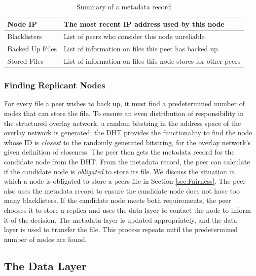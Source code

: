 \documentclass[12pt]{report}
\begin{document}
\begin{table}
\begin{center}
    \begin{tabular}{| l | l |}
    \hline
    Node IP & The most recent IP address used by this node\\ \hline
    Blacklisters & List of peers who consider this node unreliable\\ \hline
    Backed Up Files & List of information on files this peer has backed up \\ \hline
    Stored Files & List of information on files this node stores for other peers \\ \hline
    \end{tabular}
    \caption{Summary of a metadata record}
    \label{tab:metadataRecord}
\end{center}
\end{table}

\subsubsection{Finding Replicant Nodes} \label{subsubsec:FindingReplicantNodes}

For every file a peer wishes to back up, it must find a predetermined number of nodes that can store the file. To ensure an even distribution of responsibility in the structured overlay network, a random bitstring in the address space of the overlay network is generated; the DHT provides the functionality to find the node whose ID is \textit{closest} to the randomly generated bitstring, for the overlay network's given definition of closeness. The peer then gets the metadata record for the candidate node from the DHT. From the metadata record, the peer can calculate if the candidate node is \textit{obligated} to store its file. We discuss the situation in which a node is obligated to store a peers file in Section \ref{sec:Fairness}. The peer also uses the metadata record to ensure the candidate node does not have too many blacklisters. If the candidate node meets both requirements, the peer chooses it to store a replica and uses the data layer to contact the node to inform it of the decision. The metadata layer is updated appropriately, and the data layer is used to transfer the file. This process repeats until the predetermined number of nodes are found.

\subsection{The Data Layer} \label{subsec:TheDataLayer}
\end{document}
